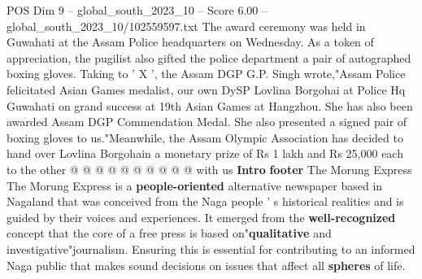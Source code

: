 \begin{textsample}{POS Dim 9 – global\_south\_2023\_10 – Score 6.00 – global\_south\_2023\_10/102559597.txt}
The award ceremony was held in Guwahati at the Assam Police headquarters on Wednesday.
As a token of appreciation, the pugilist also gifted the police department a pair of autographed boxing gloves.
Taking to ' X ', the Assam DGP G.P.
Singh wrote,"Assam Police felicitated Asian Games medalist, our own DySP Lovlina Borgohai at Police Hq Guwahati on grand success at 19th Asian Games at Hangzhou.
She has also been awarded Assam DGP Commendation Medal.
She also presented a signed pair of boxing gloves to us."Meanwhile, the Assam Olympic Association has decided to hand over Lovlina Borgohain a monetary prize of Rs 1 lakh and Rs 25,000 each to the other @ @ @ @ @ @ @ @ @ @ with us \textbf{Intro} \textbf{footer} The Morung Express The Morung Express is a \textbf{people-oriented} alternative newspaper based in Nagaland that was conceived from the Naga people ' s historical realities and is guided by their voices and experiences.
It emerged from the \textbf{well-recognized} concept that the core of a free press is based on"\textbf{qualitative} and investigative"journalism.
Ensuring this is essential for contributing to an informed Naga public that makes sound decisions on issues that affect all \textbf{spheres} of life.

\end{textsample}
